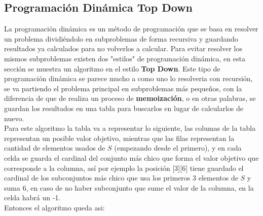 \documentclass[a4paper]{article}
\begin{document}
\subsection{Programaci\'on Din\'amica Top Down}
La programación dinámica es un método de programación que se basa en resolver un problema dividiéndolo en subproblemas de forma recursiva y guardando resultados ya calculados para no volverlos a calcular. Para evitar resolver los mismos subproblemas existen dos "estilos" de programación dinámica, en esta sección se muestra un algoritmo en el estilo \textbf{Top Down}.
Este tipo de programación dinámica se parece mucho a como uno lo resolveria con recursión, se va partiendo el problema principal en subproblemas más pequeños, con la diferencia de que de realiza un proceso de \textbf{memoización}, o en otras palabras, se guardan los resultados en una tabla para buscarlos en lugar de calcularlos de nuevo.
\\
Para este algoritmo la tabla va a representar lo siguiente, las columas de la tabla representan un posible valor objetivo, mientras que las filas representan la cantidad de elementos usados de $S$ (empezando desde el primero), y en cada celda se guarda el cardinal del conjunto más chico que forma el valor objetivo que corresponde a la columna, así por ejemplo la posición [3][6] tiene guardado el cardinal de los subconjuntos más chico que usa los primeros 3 elementos de $S$ y suma $6$, en caso de no haber subconjunto que sume el valor de la columna, en la celda habrá un -1.
\\
Entonces el algoritmo queda asi:
\end{document}
